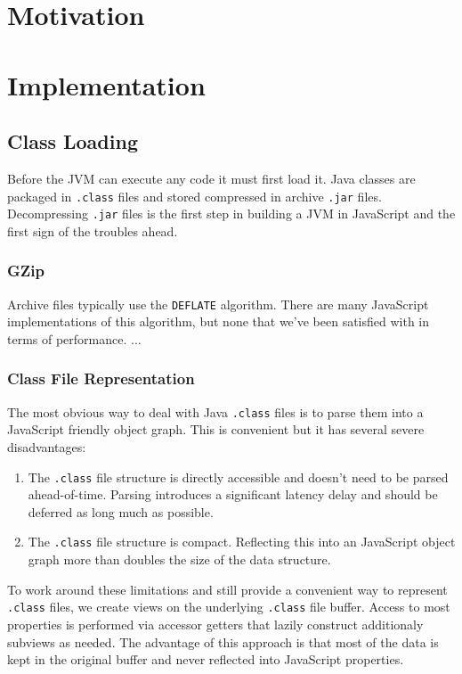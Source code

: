 \documentclass{acm_proc_article-sp}
\begin{document}
\section{Motivation}

\section{Implementation}

\subsection{Class Loading}

Before the JVM can execute any code it must first load it.
Java classes are packaged in \texttt{.class} files and stored compressed in archive \texttt{.jar} files.
Decompressing \texttt{.jar} files is the first step in building a JVM in JavaScript and the first sign of the troubles ahead.

\subsubsection{GZip}

Archive files typically use the \texttt{DEFLATE} algorithm.
There are many JavaScript implementations of this algorithm, but none that we've been satisfied with in terms of performance.
...

\subsubsection{Class File Representation}

The most obvious way to deal with Java \texttt{.class} files is to parse them into a JavaScript friendly object graph.
This is convenient but it has several severe disadvantages:
\begin{enumerate}
\item The \texttt{.class} file structure is directly accessible and doesn't need to be parsed ahead-of-time.
Parsing introduces a significant latency delay and should be deferred as long much as possible. 
\item The \texttt{.class} file structure is compact. Reflecting this into an JavaScript object graph more than doubles the size of the data structure.
\end{enumerate}

To work around these limitations and still provide a convenient way to represent \texttt{.class} files, we create views on the underlying \texttt{.class} file buffer. Access to most properties is performed via accessor getters that lazily construct additionaly subviews as needed. The advantage of this approach is that most of the data is kept in the original buffer and never reflected into JavaScript properties.
\end{document}
